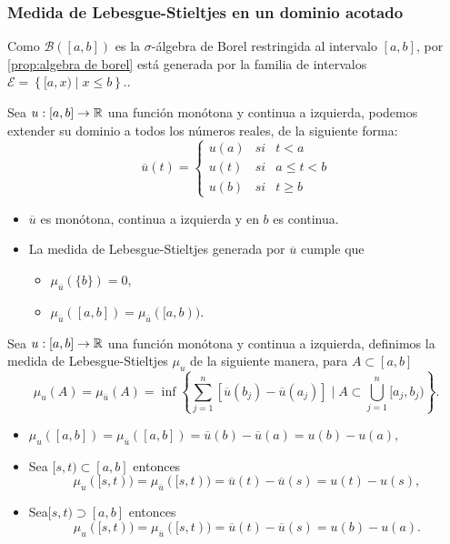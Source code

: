 \subsubsection{Medida de  Lebesgue-Stieltjes en un dominio acotado}
 Como $\mathscr{B}([a,b])$  es la $\sigma$-álgebra de Borel restringida al intervalo $[a,b]$,  por \ref{prop:algebra de borel} está generada por la familia de intervalos $\mathcal{E}=\left\lbrace [a,x) \mid x\leq b\right\rbrace $..
 
Sea $u:[a,b]\to\mathbb{R}$ una función  monótona y continua a izquierda, podemos extender su dominio a todos los números reales, de la siguiente forma:
$$\overline{u}(t)=\left\lbrace \begin{array}{rll}
	u(a) &si & t<a\\
	u(t) & si & a\leq t < b\\
	u(b)& si & t\geq b 
\end{array}\right. $$ 

\begin{obs}
	\begin{itemize}
		\item $\overline{u}$ es monótona, continua a izquierda y en $b$ es continua.
		\item La medida de Lebesgue-Stieltjes generada por $\overline{u}$ cumple que 
		\begin{itemize}
			\item $\mu_{\overline{u}}(\{b\})=0,$
			\item $\mu_{\overline{u}}([a,b])=\mu_{\overline{u}}([a,b)).$
		\end{itemize}
	\end{itemize}
\end{obs}
\begin{defi}
	Sea $u:[a,b]\to\mathbb{R}$ una función  monótona y continua a izquierda,  definimos la medida de Lebesgue-Stieltjes $\mu_u$ de la siguiente manera,  para $A\subset[a,b]$
	$$\mu_{u}(A)=\mu_{\overline{u}}(A)=\inf\left\lbrace \sum_{ j=1 }^n[\overline{u}(b_j)-\overline{u}(a_j)] \mid A\subset \bigcup_{j=1}^n[a_j,b_j)\right\rbrace. $$
	
	
\end{defi}

\begin{obs}
	\begin{itemize}
        \item $\mu_{u}([a,b])=\mu_{\overline{u}}([a,b])=\overline{u}(b)-\overline{u}(a)=u(b)-u(a),$
		\item Sea $[s,t)\subset[a,b]$ entonces $$\mu_{u}([s,t))=\mu_{\overline{u}}([s,t))=\overline{u}(t)-\overline{u}(s)=u(t)-u(s),$$
		
		\item Sea$[s,t)\supset[a,b]$ entonces
		$$\mu_{u}([s,t))=\mu_{\overline{u}}([s,t))=\overline{u}(t)-\overline{u}(s)=u(b)-u(a).$$
	\end{itemize}
\end{obs}








